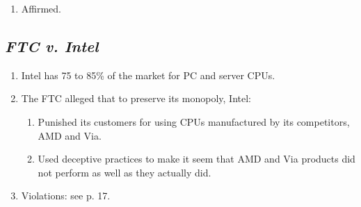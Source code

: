 \begin{enumerate}
\begin{enumerate}
        \item There is no room for balancing the benefits of the product 
        improvements against its anticompetitive effects. Innovation is 
        \textbf{per se legal} (at least in the Ninth Circuit).
        \item ``~.~.~.~Plaintiffs have provided no evidence that Tyco used its 
        monopoly power to force consumers of pulse oximetry products to adopts 
        its new OxiMax technology. Absent evidence of such compulsion, the 
        only rational inference that can be drawn from some consumers' 
        adoption of OxiMax is that they regarded it to be a superior 
        product.''\footnote{1002.}
        \item No \S\ 2 violation.
    \end{enumerate}
    \item Affirmed.
\end{enumerate}

\subsection{\emph{FTC v. Intel}}

\begin{enumerate}
    \item Intel has 75 to 85\% of the market for PC and server CPUs.
    \item The FTC alleged that to preserve its monopoly, Intel:
    \begin{enumerate}
        \item Punished its customers for using CPUs manufactured by its 
        competitors, AMD and Via.
        \item Used deceptive practices to make it seem that AMD and Via 
        products did not perform as well as they actually did.
    \end{enumerate}
    \item Violations: see p. 17.
\end{enumerate}
